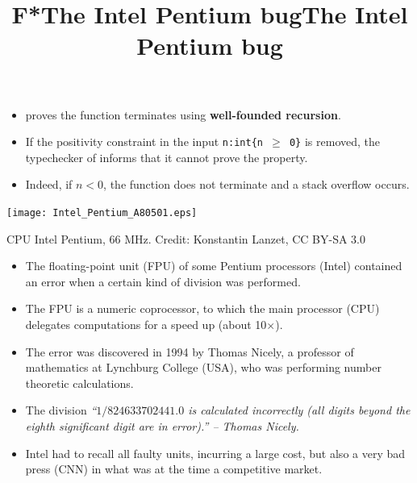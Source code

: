 \documentclass[wide]{slides}
\begin{document}
\begin{slide}
  \title{F*}

  \begin{itemize}

    \item \Fstar proves the function terminates using
      \textbf{well-founded recursion}.

    \item If the positivity constraint in the input \texttt{n:int\{n
      \(\geqslant\) 0\}} is removed, the typechecker of \Fstar informs
      that it cannot prove the property.

    \item Indeed, if \(n < 0\), the function does not terminate and a
      stack overflow occurs.

  \end{itemize}

\end{slide}

\begin{slide}
  \title{The Intel Pentium bug}

  \begin{center}
    \texttt{[image: Intel\_Pentium\_A80501.eps]}
  \end{center}

  \centerline{CPU Intel Pentium, 66 MHz. Credit: Konstantin Lanzet, CC
    BY-SA 3.0}
\end{slide}

\begin{slide}
  \title{The Intel Pentium bug}

  \begin{itemize}

    \item The floating-point unit (FPU) of some Pentium processors
      (Intel) contained an error when a certain kind of division was
      performed.

    \item The FPU is a numeric coprocessor, to which the main
      processor (CPU) delegates computations for a speed up (about
      10$\times$).

    \item The error was discovered in 1994 by Thomas Nicely, a
      professor of mathematics at Lynchburg College (USA), who was
      performing number theoretic calculations.

    \item The division \emph{``\(1/824633702441.0\) is calculated
      incorrectly (all digits beyond the eighth significant digit are
      in error).'' -- Thomas Nicely.}

    \item Intel had to recall all faulty units, incurring a large
      cost, but also a very bad press (CNN) in what was at the time a
      competitive market.

  \end{itemize}

\end{slide}
\end{document}
